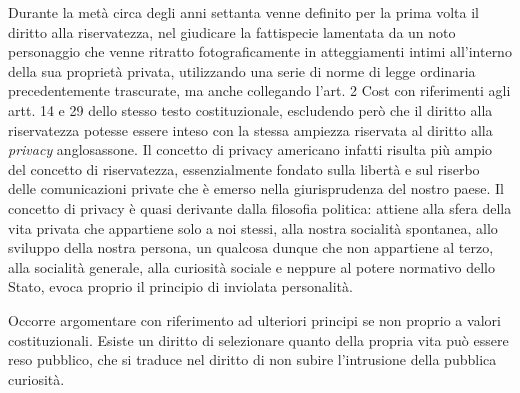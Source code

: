 Durante la metà circa degli anni settanta venne definito per la prima volta il diritto alla riservatezza, nel giudicare la fattispecie lamentata da un noto personaggio che venne ritratto fotograficamente in atteggiamenti intimi all'interno della sua proprietà privata, utilizzando una serie di norme di legge ordinaria precedentemente trascurate, ma anche collegando l'art. 2 Cost con riferimenti agli artt. 14 e 29 dello stesso testo costituzionale, escludendo però che il diritto alla riservatezza potesse essere inteso con la stessa ampiezza riservata al diritto alla \textit{privacy} anglosassone. Il concetto di privacy americano infatti risulta più ampio del concetto di riservatezza, essenzialmente fondato sulla libertà e sul riserbo delle comunicazioni private che è emerso nella giurisprudenza del  nostro paese.
Il concetto di privacy è quasi derivante dalla filosofia politica: attiene alla sfera della vita privata che appartiene solo a noi stessi, alla nostra socialità spontanea, allo sviluppo della nostra persona, un qualcosa dunque che non appartiene al terzo, alla socialità generale, alla curiosità sociale e neppure al potere normativo dello Stato, evoca proprio il principio di inviolata personalità. 

Occorre argomentare con riferimento ad ulteriori principi se non proprio a valori costituzionali. Esiste un diritto di selezionare quanto della propria vita può essere reso pubblico, che si traduce nel diritto di non subire l'intrusione della pubblica curiosità.


